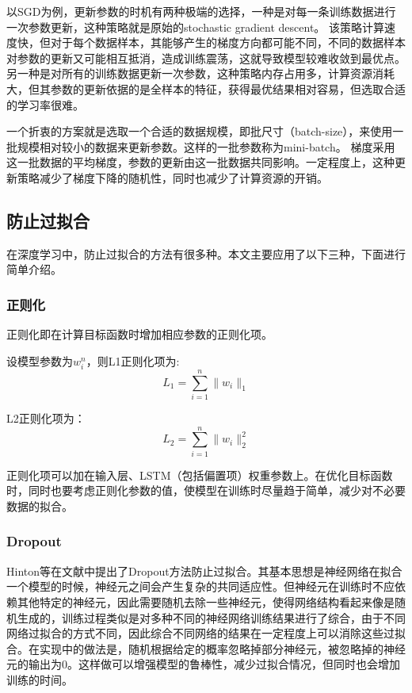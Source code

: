 以SGD为例，更新参数的时机有两种极端的选择，一种是对每一条训练数据进行一次参数更新，这种策略就是原始的stochastic gradient descent。
该策略计算速度快，但对于每个数据样本，其能够产生的梯度方向都可能不同，不同的数据样本对参数的更新又可能相互抵消，造成训练震荡，这就导致模型较难收敛到最优点。
另一种是对所有的训练数据更新一次参数，这种策略内存占用多，计算资源消耗大，但其参数的更新依据的是全样本的特征，获得最优结果相对容易，但选取合适的学习率很难。

一个折衷的方案就是选取一个合适的数据规模，即批尺寸（batch-size），来使用一批规模相对较小的数据来更新参数。这样的一批参数称为mini-batch。
梯度采用这一批数据的平均梯度，参数的更新由这一批数据共同影响。一定程度上，这种更新策略减少了梯度下降的随机性，同时也减少了计算资源的开销。
\subsection{防止过拟合}
在深度学习中，防止过拟合的方法有很多种。本文主要应用了以下三种，下面进行简单介绍。
\subsubsection{正则化}
正则化即在计算目标函数时增加相应参数的正则化项。

设模型参数为$w_i^n$，则L1正则化项为:
\begin{equation}
    L_1 = \sum^n_{i=1}\lVert w_i \rVert_1
\end{equation}

L2正则化项为：
\begin{equation}
    L_2 = \sum^n_{i=1}\lVert w_i \rVert_2^2
\end{equation}

正则化项可以加在输入层、LSTM（包括偏置项）权重参数上。在优化目标函数时，同时也要考虑正则化参数的值，使模型在训练时尽量趋于简单，减少对不必要数据的拟合。
\subsubsection{Dropout}
Hinton等在文献\citep{srivastava2014dropout}中提出了Dropout方法防止过拟合。其基本思想是神经网络在拟合一个模型的时候，神经元之间会产生复杂的共同适应性。但神经元在训练时不应依赖其他特定的神经元，因此需要随机去除一些神经元，使得网络结构看起来像是随机生成的，训练过程类似是对多种不同的神经网络训练结果进行了综合，由于不同网络过拟合的方式不同，因此综合不同网络的结果在一定程度上可以消除这些过拟合。在实现中的做法是，随机根据给定的概率忽略掉部分神经元，被忽略掉的神经元的输出为0。这样做可以增强模型的鲁棒性，减少过拟合情况，但同时也会增加训练的时间。

